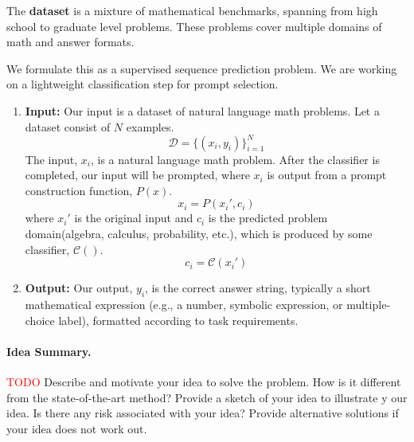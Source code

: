 \documentclass{article}
\begin{document}
The \textbf{dataset} is a mixture of mathematical benchmarks, spanning from high school to graduate level problems. These problems cover multiple domains of math and answer formats.

We formulate this as a supervised sequence prediction problem. We are working on a lightweight classification step for prompt selection.
\begin{enumerate}
    \item \textbf{Input:} Our input is a dataset of natural language math problems. Let a dataset consist of $N$ examples.
    $$\mathcal{D} = \{(x_i, y_i)\}^N_{i=1}$$
    The input, $x_i$, is a natural language math problem. After the classifier is completed, our input will be prompted, where $x_i$ is output from a prompt construction function, $P(x)$. $$x_i = P(x_i', c_i)$$
    where $x_i'$ is the original input and $c_i$ is the predicted problem domain(algebra, calculus, probability, etc.), which is produced by some classifier, $\mathcal{C}()$.
    $$c_i = \mathcal{C}(x_i')$$
    \item \textbf{Output:} Our output, $y_i$, is the correct answer string, typically a short mathematical expression (e.g., a number, symbolic expression, or multiple-choice label), formatted according to task requirements.
\end{enumerate}

\paragraph{Idea Summary.}
\textcolor{red}{TODO} Describe and motivate your idea to solve the problem.  How is it different from the state-of-the-art method? Provide a sketch of your idea to illustrate y our idea. Is there any risk associated with your idea? Provide alternative solutions if your idea does not work out.


\end{document}
